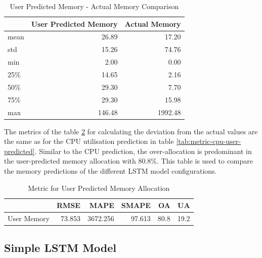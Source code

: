       \begin{table}
        \centering
        \caption{User Predicted Memory - Actual Memory Comparison}
        \label{tab:user-predicted-memory-comparison}
        \begin{tabular}{|l|rr|}
          \toprule
          {} &  User Predicted Memory &  Actual Memory \\
          \midrule
          mean       &          26.89 &    17.20 \\
          std        &          15.26 &    74.76 \\
          min        &           2.00 &     0.00 \\
          25\%        &          14.65 &     2.16 \\
          50\%        &          29.30 &     7.70 \\
          75\%        &          29.30 &    15.98 \\
          max        &         146.48 &  1992.48 \\
          \bottomrule
          \end{tabular}
      \end{table}
      The metrics of the table \ref{tab:metric-mem-user-predicted} for calculating the deviation from the actual values are the same as for the CPU utilisation prediction in table \ref{tab:metric-cpu-user-predicted}.
      Similar to the CPU prediction, the over-allocation is predominant in the user-predicted memory allocation with $80.8\%$.
      This table is used to compare the memory predictions of the different LSTM model configurations. 

      \begin{table}
        \centering
        \caption{Metric for User Predicted Memory Allocation}
        \label{tab:metric-mem-user-predicted}
        \begin{tabular}{|l|rrrrr|}
          \toprule
          {} &    RMSE &     MAPE &   SMAPE &     OA &     UA \\
          \midrule
          User Memory &  73.853 &  3672.256 &  97.613 &  80.8 &  19.2 \\
          \bottomrule
          \end{tabular}
      \end{table}

  \subsection{Simple LSTM Model}
  \label{sec:simple-lstm-model-evaluation-scenarios}
    
